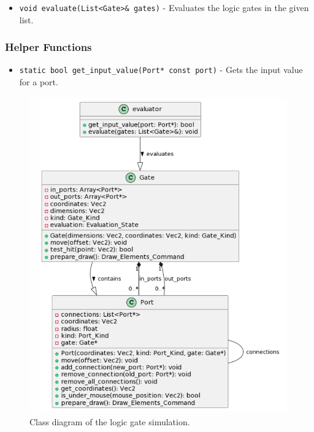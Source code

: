 \documentclass{article}
\begin{document}
\begin{itemize}
    \item \texttt{void evaluate(List<Gate>\& gates)} - Evaluates the logic gates in the given list.
\end{itemize}

\subsubsection*{Helper Functions}

\begin{itemize}
    \item \texttt{static bool get\_input\_value(Port* const port)} - Gets the input value for a port.
\end{itemize}

\begin{figure}[h]
    \centering
    \includegraphics[width=1\textwidth]{diagramklas.png}
    \caption{Class diagram of the logic gate simulation.}
    \label{fig:class_diagram}
\end{figure}
\end{document}
